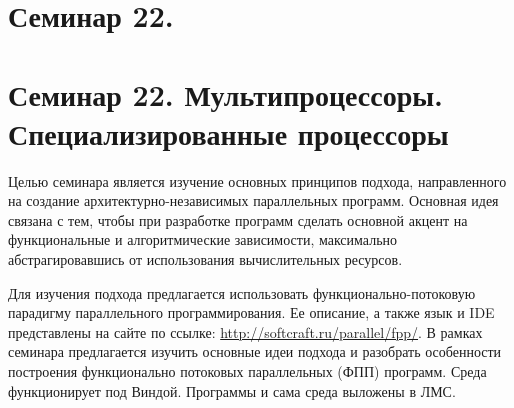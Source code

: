 \chapter[22]{Семинар 22. }

\chapter{Семинар 22. Мультипроцессоры. Специализированные процессоры}

Целью семинара является изучение основных принципов подхода, направленного на создание архитектурно-независимых параллельных программ. Основная идея связана с тем, чтобы при разработке программ сделать основной акцент на функциональные и алгоритмические зависимости, максимально абстрагировавшись от использования вычислительных ресурсов.

Для изучения подхода предлагается использовать функционально-потоковую парадигму параллельного программирования. Ее описание, а также язык и IDE представлены на сайте по ссылке: \url{http://softcraft.ru/parallel/fpp/}. В рамках семинара предлагается изучить основные идеи подхода и разобрать особенности построения функционально потоковых параллельных (ФПП) программ. Среда функционирует под Виндой. Программы и сама среда выложены в ЛМС.

